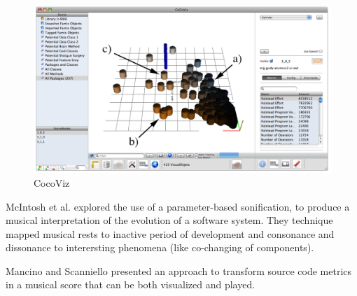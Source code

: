 \begin{figure}[H]
  \includegraphics[width=0.9\linewidth]{CocoViz.png} 
  \caption{CocoViz}
\end{figure}



McIntosh et al. \cite{McIntosh2014} explored the use of a parameter-based sonification, to produce a musical interpretation of the evolution of a software system.
They technique mapped musical rests to inactive period of development and consonance and dissonance to interersting phenomena (like co-changing of components).

Mancino and Scanniello \cite{Mancino2017} presented an approach to transform source code metrics in a musical score that can be both visualized and played. 
